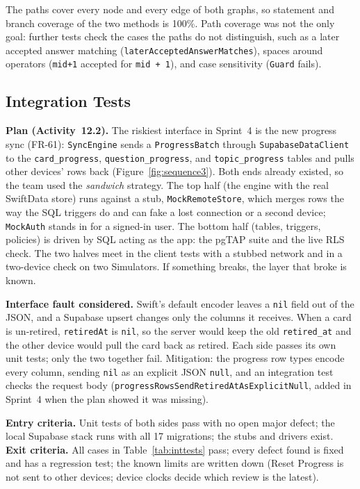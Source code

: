 \documentclass[12pt,letterpaper]{article}
\begin{document}
The paths cover every node and every edge of both graphs, so statement and branch
coverage of the two methods is 100\%. Path coverage was not the only goal: further
tests check the cases the paths do not distinguish, such as a later accepted answer
matching (\texttt{laterAcceptedAnswerMatches}), spaces around operators
(\texttt{mid+1} accepted for \texttt{mid + 1}), and case sensitivity
(\texttt{Guard} fails).

\subsection{Integration Tests}\label{sec:integration}
\textbf{Plan (Activity~12.2).} The riskiest interface in Sprint~4 is the new progress
sync (FR-61): \texttt{SyncEngine} sends a \texttt{ProgressBatch} through
\texttt{SupabaseDataClient} to the \texttt{card\_progress},
\texttt{question\_progress}, and \texttt{topic\_progress} tables and pulls other
devices' rows back (Figure~\ref{fig:sequence3}). Both ends already existed, so the
team used the \emph{sandwich} strategy. The top half (the engine with the real
SwiftData store) runs against a stub, \texttt{MockRemoteStore}, which merges rows the
way the SQL triggers do and can fake a lost connection or a second device;
\texttt{MockAuth} stands in for a signed-in user. The bottom half (tables, triggers,
policies) is driven by SQL acting as the app: the pgTAP suite and the live RLS check.
The two halves meet in the client tests with a stubbed network and in a two-device
check on two Simulators. If something breaks, the layer that broke is known.

\textbf{Interface fault considered.} Swift's default encoder leaves a \texttt{nil}
field out of the JSON, and a Supabase upsert changes only the columns it receives.
When a card is un-retired, \texttt{retiredAt} is \texttt{nil}, so the server would keep
the old \texttt{retired\_at} and the other device would pull the card back as retired.
Each side passes its own unit tests; only the two together fail. Mitigation: the
progress row types encode every column, sending \texttt{nil} as an explicit JSON
\texttt{null}, and an integration test checks the request body
(\texttt{progressRowsSendRetiredAtAsExplicitNull}, added in Sprint~4 when the plan
showed it was missing).

\textbf{Entry criteria.} Unit tests of both sides pass with no open major defect; the
local Supabase stack runs with all 17 migrations; the stubs and drivers exist.
\textbf{Exit criteria.} All cases in Table~\ref{tab:inttests} pass; every defect found
is fixed and has a regression test; the known limits are written down (Reset Progress
is not sent to other devices; device clocks decide which review is the latest).
\end{document}
